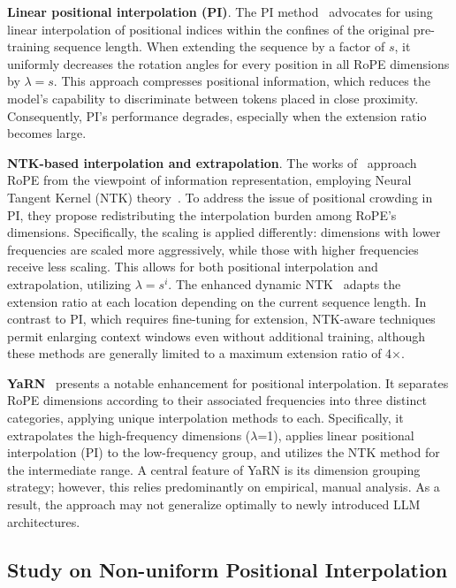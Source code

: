 \textbf{Linear positional interpolation (PI)}. The PI method~\cite{pi} advocates for using linear interpolation of positional indices within the confines of the original pre-training sequence length. When extending the sequence by a factor of $s$, it uniformly decreases the rotation angles for every position in all RoPE dimensions by $\lambda = s$. This approach compresses positional information, which reduces the model's capability to discriminate between tokens placed in close proximity. Consequently, PI's performance degrades, especially when the extension ratio becomes large.

\textbf{NTK-based interpolation and extrapolation}. The works of~\cite{ntk,dynamicntk} approach RoPE from the viewpoint of information representation, employing Neural Tangent Kernel (NTK) theory~\cite{jacot2018neural,tancik2020fourier}. To address the issue of positional crowding in PI, they propose redistributing the interpolation burden among RoPE’s dimensions. Specifically, the scaling is applied differently: dimensions with lower frequencies are scaled more aggressively, while those with higher frequencies receive less scaling. This allows for both positional interpolation and extrapolation, utilizing $\lambda=s^{i}$. The enhanced dynamic NTK~\cite{dynamicntk} adapts the extension ratio at each location depending on the current sequence length. In contrast to PI, which requires fine-tuning for extension, NTK-aware techniques permit enlarging context windows even without additional training, although these methods are generally limited to a maximum extension ratio of 4$\times$.

\textbf{YaRN}~\cite{yarn} presents a notable enhancement for positional interpolation. It separates RoPE dimensions according to their associated frequencies into three distinct categories, applying unique interpolation methods to each. Specifically, it extrapolates the high-frequency dimensions ($\lambda$=1), applies linear positional interpolation (PI) to the low-frequency group, and utilizes the NTK method for the intermediate range. A central feature of YaRN is its dimension grouping strategy; however, this relies predominantly on empirical, manual analysis. As a result, the approach may not generalize optimally to newly introduced LLM architectures.

\subsection{Study on Non-uniform Positional Interpolation}

